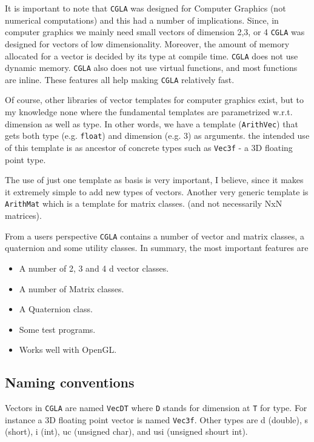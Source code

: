 \documentclass[a4paper]{article}
\begin{document}
It is important to note that \texttt{CGLA} was designed for Computer Graphics 
(not numerical computations) and this had a number of
implications. Since, in computer graphics we mainly need small vectors
of dimension 2,3, or 4 \texttt{CGLA} was designed for vectors of low
dimensionality. Moreover, the amount of memory allocated for a vector
is decided by its type at compile time. \texttt{CGLA} does not use dynamic
memory. \texttt{CGLA} also does not use virtual functions, and most functions
are inline. These features all help making \texttt{CGLA} relatively fast. 

Of course, other libraries of vector templates for computer graphics
exist, but to my knowledge none where the fundamental templates are
parametrized w.r.t. dimension as well as type. In other words, we have
a template (\texttt{ArithVec}) that gets both type
(e.g. \texttt{float}) and dimension 
(e.g. 3) as arguments. the intended use of this template is as
ancestor of concrete types such as \texttt{Vec3f} - a 3D floating
point type. 

The use of just one template as basis is very important, I believe,
since it makes it extremely simple to add new types of
vectors. Another very generic template is \texttt{ArithMat} which is a
template for matrix classes. (and not necessarily NxN matrices). 

From a users perspective \texttt{CGLA} contains a number of vector and matrix
classes, a quaternion and some utility classes. In summary, the most
important features are
\begin{itemize}
\item A number of 2, 3 and 4 d vector classes.
\item A number of Matrix classes.
\item A Quaternion class.
\item Some test programs.
\item Works well with OpenGL.
\end{itemize}


\subsection{Naming conventions}

Vectors in \texttt{CGLA} are named \texttt{VecDT} where \texttt{D} stands for
dimension at  \texttt{T} 
for type. For instance a 3D floating point vector is named
\texttt{Vec3f}. Other types are d (double), s (short), i (int), uc
(unsigned char), and usi (unsigned shourt int).
\end{document}
